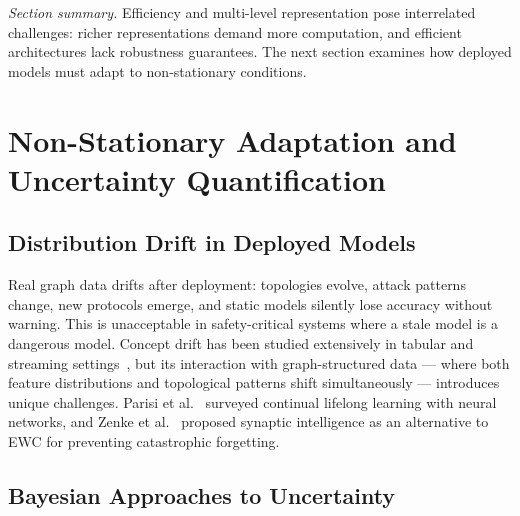 \medskip
\noindent\textit{Section summary.} Efficiency and multi-level representation pose interrelated challenges: richer representations demand more computation, and efficient architectures lack robustness guarantees. The next section examines how deployed models must adapt to non-stationary conditions.


\section{Non-Stationary Adaptation and Uncertainty Quantification}
\label{sec:nonstationarity}

\subsection{Distribution Drift in Deployed Models}

Real graph data drifts after deployment: topologies evolve, attack patterns change, new protocols emerge, and static models silently lose accuracy without warning. This is unacceptable in safety-critical systems where a stale model is a dangerous model. Concept drift has been studied extensively in tabular and streaming settings~\cite{Gama2014,Lu2019}, but its interaction with graph-structured data --- where both feature distributions and topological patterns shift simultaneously --- introduces unique challenges. Parisi et al.~\cite{Parisi2019} surveyed continual lifelong learning with neural networks, and Zenke et al.~\cite{Zenke2017,Wilson2020} proposed synaptic intelligence as an alternative to EWC for preventing catastrophic forgetting.


\subsection{Bayesian Approaches to Uncertainty}

